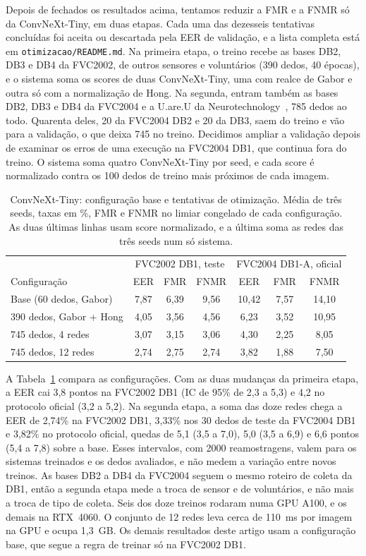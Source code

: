 \documentclass[conference]{IEEEtran}
\begin{document}
Depois de fechados os resultados acima, tentamos reduzir a FMR e a FNMR só da ConvNeXt-Tiny, em duas etapas. Cada uma das dezesseis tentativas concluídas foi aceita ou descartada pela EER de validação, e a lista completa está em \texttt{otimizacao/README.md}. Na primeira etapa, o treino recebe as bases DB2, DB3 e DB4 da FVC2002, de outros sensores e voluntários (390 dedos, 40 épocas), e o sistema soma os scores de duas ConvNeXt-Tiny, uma com realce de Gabor e outra só com a normalização de Hong. Na segunda, entram também as bases DB2, DB3 e DB4 da FVC2004 e a U.are.U da Neurotechnology~\cite{neurotech2026uareu}, 785 dedos ao todo. Quarenta deles, 20 da FVC2004 DB2 e 20 da DB3, saem do treino e vão para a validação, o que deixa 745 no treino. Decidimos ampliar a validação depois de examinar os erros de uma execução na FVC2004 DB1, que continua fora do treino. O sistema soma quatro ConvNeXt-Tiny por seed, e cada score é normalizado contra os 100 dedos de treino mais próximos de cada imagem.

\begin{table}[t]
\centering
\caption{ConvNeXt-Tiny: configuração base e tentativas de otimização. Média de três seeds, taxas em \%, FMR e FNMR no limiar congelado de cada configuração. As duas últimas linhas usam score normalizado, e a última soma as redes das três seeds num só sistema.}
\label{tab:otim}
\footnotesize
\setlength{\tabcolsep}{2.5pt}
\begin{tabular}{@{}lcccccc@{}}
\toprule
 & \multicolumn{3}{c}{FVC2002 DB1, teste} & \multicolumn{3}{c}{FVC2004 DB1-A, oficial} \\
Configuração & EER & FMR & FNMR & EER & FMR & FNMR \\
\midrule
Base (60 dedos, Gabor) & 7,87 & 6,39 & 9,56 & 10,42 & 7,57 & 14,10 \\
390 dedos, Gabor + Hong & 4,05 & 3,56 & 4,56 & 6,23 & 3,52 & 10,95 \\
745 dedos, 4 redes & 3,07 & 3,15 & 3,06 & 4,30 & 2,25 & 8,05 \\
745 dedos, 12 redes & 2,74 & 2,75 & 2,74 & 3,82 & 1,88 & 7,50 \\
\bottomrule
\end{tabular}
\end{table}

A Tabela~\ref{tab:otim} compara as configurações. Com as duas mudanças da primeira etapa, a EER cai 3,8 pontos na FVC2002 DB1 (IC de 95\% de 2,3 a 5,3) e 4,2 no protocolo oficial (3,2 a 5,2). Na segunda etapa, a soma das doze redes chega a EER de 2,74\% na FVC2002 DB1, 3,33\% nos 30 dedos de teste da FVC2004 DB1 e 3,82\% no protocolo oficial, quedas de 5,1 (3,5 a 7,0), 5,0 (3,5 a 6,9) e 6,6 pontos (5,4 a 7,8) sobre a base. Esses intervalos, com \num{2000} reamostragens, valem para os sistemas treinados e os dedos avaliados, e não medem a variação entre novos treinos. As bases DB2 a DB4 da FVC2004 seguem o mesmo roteiro de coleta da DB1, então a segunda etapa mede a troca de sensor e de voluntários, e não mais a troca de tipo de coleta. Seis dos doze treinos rodaram numa GPU A100, e os demais na RTX~4060. O conjunto de 12 redes leva cerca de 110~ms por imagem na GPU e ocupa 1,3~GB. Os demais resultados deste artigo usam a configuração base, que segue a regra de treinar só na FVC2002 DB1.
\end{document}
